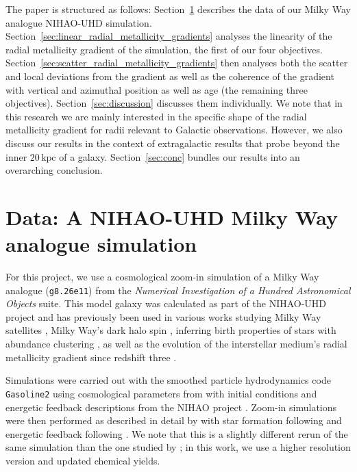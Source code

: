 \documentclass[twocolumn,apj,numberedappendix,appendixfloats,twocolappendix]{openjournal}
\begin{document}
\begin{CJK*}{UTF8}{gbsn}
The paper is structured as follows: Section~\ref{sec:data} describes the data of our Milky Way analogue NIHAO-UHD simulation. Section~\ref{sec:linear_radial_metallicity_gradients} analyses the linearity of the radial metallicity gradient of the simulation, the first of our four objectives. Section~\ref{sec:scatter_radial_metallicity_gradients} then analyses both the scatter and local deviations from the gradient as well as the coherence of the gradient with vertical and azimuthal position as well as age (the remaining three objectives). Section~\ref{sec:discussion} discusses them individually. We note that in this research we are mainly interested in the specific shape of the radial metallicity gradient for radii relevant to Galactic observations. However, we also discuss our results in the context of extragalactic results that probe beyond the inner $20\,\mathrm{kpc}$ of a galaxy. Section~\ref{sec:conc} bundles our results into an overarching conclusion. 

\section{Data: A NIHAO-UHD Milky Way analogue simulation} \label{sec:data}

For this project, we use a cosmological zoom-in simulation of a Milky Way analogue (\texttt{g8.26e11}) from the \textit{Numerical Investigation of a Hundred Astronomical Objects} \citep[NIHAO,][]{Wang2015} suite. This model galaxy was calculated as part of the NIHAO-UHD project \citep{Buck2020b} and has previously been used in various works studying Milky Way satellites \citep{Buck2019b}, Milky Way's dark halo spin \citep{Obreja2022}, inferring birth properties of stars with abundance clustering \citep{Ratcliffe2022}, as well as the evolution of the interstellar medium's radial metallicity gradient since redshift three \citep{Ratcliffe2024b}.

Simulations were carried out with the smoothed particle hydrodynamics code \texttt{Gasoline2} \citep{Wadsley2017} using cosmological parameters from \citet{Planck2014} with initial conditions and energetic feedback descriptions from the NIHAO project \citep{Wang2015}. Zoom-in simulations were then performed as described in detail by \citet{Buck2021} with star formation following \citet{Stinson2006} and energetic feedback following \citet{Stinson2013}. We note that this is a slightly different rerun of the same simulation than the one studied by \citet{Buder2024}; in this work, we use a higher resolution version and updated chemical yields.


\end{CJK*}
\end{document}
